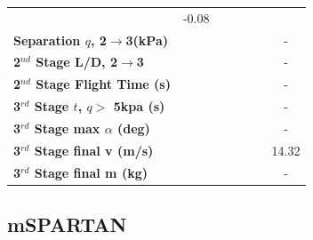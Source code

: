 \begin{table}[ht!]
\begin{tabular}{l c c c c c c}
	&-0.08
	\\
	\textbf{Separation $q$, 2$\rightarrow$3(kPa)}
	& \secondthirdSeparationqIspNinetyNoReturn
	& \secondthirdSeparationqIspNinetyFiveNoReturn
	& \secondthirdSeparationqIspStandardNoReturn
	& \secondthirdSeparationqIspOneHundredFiveNoReturn
	& \secondthirdSeparationqIspOneHundredTenNoReturn
	& -
	\\
	\textbf{2$^{nd}$ Stage L/D, 2$\rightarrow$3}
	& \secondthirdSeparationLDIspNinetyNoReturn
	& \secondthirdSeparationLDIspNinetyFiveNoReturn
	& \secondthirdSeparationLDIspStandardNoReturn
	& \secondthirdSeparationLDIspOneHundredFiveNoReturn
	& \secondthirdSeparationLDIspOneHundredTenNoReturn
	& -
	\\
	\textbf{2$^{nd}$ Stage Flight Time (s)}
	& \secondFlightTimeIspNinetyNoReturn
	& \secondFlightTimeIspNinetyFiveNoReturn
	& \secondFlightTimeIspStandardNoReturn
	& \secondFlightTimeIspOneHundredFiveNoReturn
	& \secondFlightTimeIspOneHundredTenNoReturn
	& -
	\\
	\textbf{3$^{rd}$ Stage $t$, $q >$ 5kpa (s)}
	& \thirdqOverFiveIspNinetyNoReturn
	& \thirdqOverFiveIspNinetyFiveNoReturn
	& \thirdqOverFiveIspStandardNoReturn
	& \thirdqOverFiveIspOneHundredFiveNoReturn
	& \thirdqOverFiveIspOneHundredTenNoReturn
	& -
	\\
	\textbf{3$^{rd}$ Stage max $\alpha$ (deg)}
	& \thirdmaxAoAIspNinetyNoReturn
	& \thirdmaxAoAIspNinetyFiveNoReturn
	& \thirdmaxAoAIspStandardNoReturn
	& \thirdmaxAoAIspOneHundredFiveNoReturn
	& \thirdmaxAoAIspOneHundredTenNoReturn
	& -
	\\
	\textbf{3$^{rd}$ Stage final v (m/s)}
	& \thirdcircvIspNinetyNoReturn
	& \thirdcircvIspNinetyFiveNoReturn
	& \thirdcircvIspStandardNoReturn
	& \thirdcircvIspOneHundredFiveNoReturn
	& \thirdcircvIspOneHundredTenNoReturn
	&14.32
	\\
	\textbf{3$^{rd}$ Stage final m (kg)}
	& \thirdcircmIspNinetyNoReturn
	& \thirdcircmIspNinetyFiveNoReturn
	& \thirdcircmIspStandardNoReturn
	& \thirdcircmIspOneHundredFiveNoReturn
	& \thirdcircmIspOneHundredTenNoReturn
	& -
	\\
	\hline 
\end{tabular} 
\end{table}



\subsection{mSPARTAN}\label{sec:SpartanMassnoreturn}

